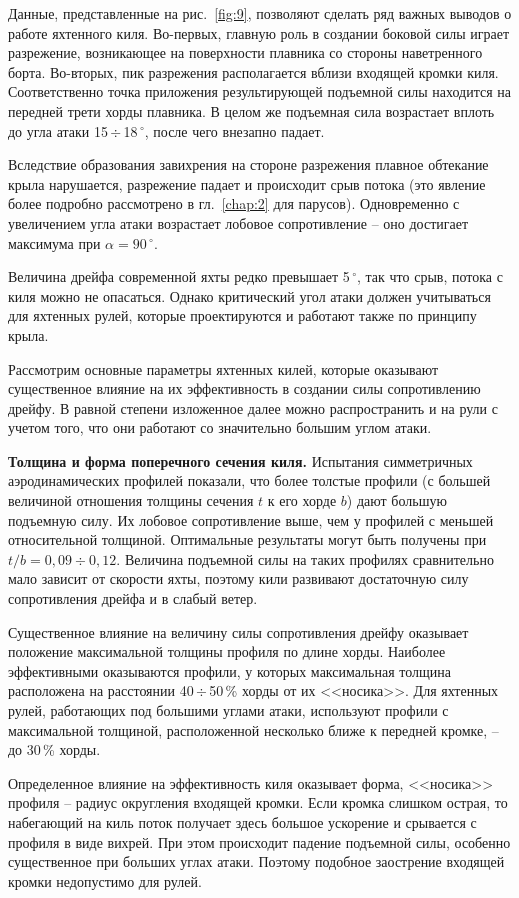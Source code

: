 \documentclass[a4paper, 12pt, twoside, final, book, russian, fittopage, cyremdash]{ncc}
\newcommand{\gr}{\ensuremath{\,^\circ}\xspace}
\newcommand{\otdo}{\,\ensuremath{\div}\,}
\newcommand{\motdo}{\div}
\newcommand{\ris}[1]{\ref{fig:#1}}
\begin{document}
Данные, представленные на рис.~\ris{9}, позволяют сделать ряд важных выводов о работе яхтенного киля. Во-первых, главную роль в создании боковой силы играет разрежение, возникающее на поверхности плавника со стороны наветренного борта. Во-вторых, пик разрежения располагается вблизи входящей кромки киля. Соответственно точка приложения результирующей подъемной силы находится на передней трети хорды плавника. В целом же подъемная сила возрастает вплоть до угла атаки 15\otdo 18\gr, после чего внезапно падает.

Вследствие образования завихрения на стороне разрежения плавное обтекание крыла нарушается, разрежение падает и происходит срыв потока (это явление более подробно рассмотрено в гл.~\ref{chap:2} для парусов). Одновременно с увеличением угла атаки возрастает лобовое сопротивление \--- оно достигает максимума при $\alpha = 90\gr$.

Величина дрейфа современной яхты редко превышает 5\gr, так что срыв, потока с киля можно не опасаться. Однако критический угол атаки должен учитываться для яхтенных рулей, которые проектируются и работают также по принципу крыла. 

Рассмотрим основные параметры яхтенных килей, которые оказывают существенное влияние на их эффективность в создании силы сопротивлению дрейфу. В равной степени изложенное далее можно распространить и на рули с учетом того, что они работают со значительно большим углом атаки.

\textbf{Толщина и форма поперечного сечения киля.} Испытания симметричных аэродинамических профилей показали, что более толстые профили (с большей величиной отношения толщины сечения $t$ к его хорде $b$) дают большую подъемную силу. Их лобовое сопротивление выше, чем у профилей с меньшей относительной толщиной. Оптимальные результаты могут быть получены при $t/b = 0,09 \motdo 0,12$. Величина подъемной силы на таких профилях сравнительно мало зависит от скорости яхты, поэтому кили развивают достаточную силу сопротивления дрейфа и в слабый ветер. 

Существенное влияние на величину силы сопротивления дрейфу оказывает положение максимальной толщины профиля по длине хорды. Наиболее эффективными оказываются профили, у которых максимальная толщина расположена на расстоянии 40\otdo 50\,\% хорды от их <<носика>>. Для яхтенных рулей, работающих под большими углами атаки, используют профили с максимальной толщиной, расположенной несколько ближе к передней кромке, \--- до 30\,\% хорды.

Определенное влияние на эффективность киля оказывает форма, <<носика>> профиля \--- радиус округления входящей кромки. Если кромка слишком острая, то набегающий на киль поток получает здесь большое ускорение и срывается с профиля в виде вихрей. При этом происходит падение подъемной силы, особенно существенное при больших углах атаки. Поэтому подобное заострение входящей кромки недопустимо для рулей. 
\end{document}
